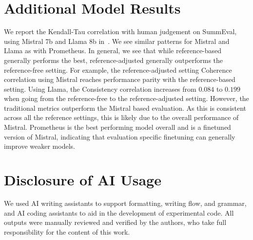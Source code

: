 \section{Additional Model Results}\label{sec:6-appendix-add-models}

We report the Kendall-Tau correlation with human judgement on SummEval, using Mistral 7b and Llama 8b in~.
We see similar patterns for Mistral and Llama as with Prometheus. In general, we see that while reference-based generally performs the best, reference-adjusted generally outperforms the reference-free setting. For example, the reference-adjusted setting Coherence correlation using Mistral reaches performance parity with the reference-based setting. Using Llama, the Consistency correlation increases from $0.084$ to $0.199$ when going from the reference-free to the reference-adjusted setting. However,  the traditional metrics outperform the Mistral based evaluation. As this is consistent across all the reference settings, this is likely due to the overall performance of Mistral. Prometheus is the best performing model overall and is a finetuned version of Mistral, indicating that evaluation specific finetuning can generally improve weaker models.

\section{Disclosure of AI Usage}
We used AI writing assistants to support formatting, writing flow, and grammar, and AI coding assistants to aid in the development of experimental code. All outputs were manually reviewed and verified by the authors, who take full responsibility for the content of this work.


